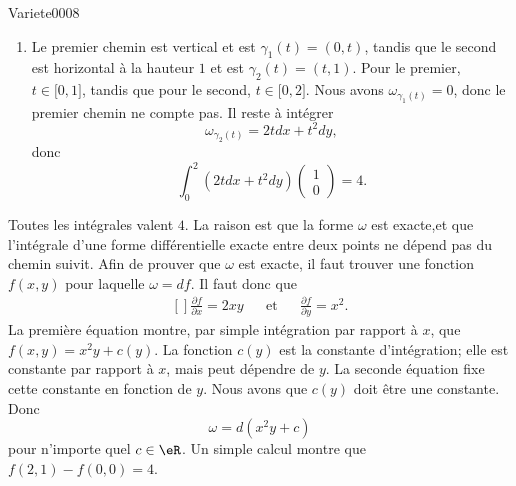 \begin{corrige}{Variete0008}
\begin{enumerate}
		\item
			Le premier chemin est vertical et est $\gamma_1(t)=(0,t)$, tandis que le second est horizontal à la hauteur $1$ et est $\gamma_2(t)=(t,1)$. Pour le premier, $t\in\mathopen[ 0 , 1 \mathclose]$, tandis que pour le second, $t\in\mathopen[ 0 , 2 \mathclose]$. Nous avons $\omega_{\gamma_1(t)}=0$, donc le premier chemin ne compte pas. Il reste à intégrer
			\begin{equation}
				\omega_{\gamma_2(t)}=2tdx+t^2dy,
			\end{equation}
			donc
			\begin{equation}
				\int_0^2(2tdx+t^2dy)\begin{pmatrix}
					1	\\ 
					0	
				\end{pmatrix}=4.
			\end{equation}

	\end{enumerate}
	Toutes les intégrales valent $4$. La raison est que la forme $\omega$ est exacte,et que l'intégrale d'une forme différentielle exacte entre deux points ne dépend pas du chemin suivit. Afin de prouver que $\omega$ est exacte, il faut trouver une fonction $f(x,y)$ pour laquelle $\omega=df$. Il faut donc que
	\begin{equation}
		\begin{aligned}[]
			\frac{ \partial f }{ \partial x }=2xy&&\text{et}&&
			\frac{ \partial f }{ \partial y }=x^2.
		\end{aligned}
	\end{equation}
	La première équation montre, par simple intégration par rapport à $x$, que $f(x,y)=x^2y+c(y)$. La fonction $c(y)$ est la constante d'intégration; elle est constante par rapport à $x$, mais peut dépendre de $y$. La seconde équation fixe cette constante en fonction de $y$. Nous avons que $c(y)$ doit être une constante. Donc
	\begin{equation}
		\omega=d(x^2y+c)
	\end{equation}
	pour n'importe quel $c\in\eR$. Un simple calcul montre que $f(2,1)-f(0,0)=4$.

\end{corrige}
